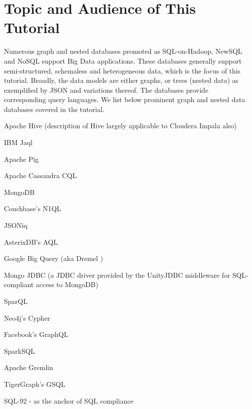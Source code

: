 
\section{Topic and Audience of This Tutorial}
Numerous graph and nested databases promoted as SQL-on-Hadoop, NewSQL and NoSQL support Big Data applications. These databases generally support semi-structured, schemaless and heterogeneous data, which is the focus of this tutorial. Broadly, the data models are either graphs, or trees (nested data) as exemplified by JSON and variations thereof. The databases provide corresponding query languages. We list below prominent graph and nested data databases covered in ths tutorial.


\begin{compact_enum}
\item Apache Hive \cite{hive-icde-2010} (description of Hive largely applicable to Cloudera Impala \cite{impala} also)
\item IBM Jaql \cite{jaql-pvldb-2011}
\item Apache Pig \cite{pig-sigmod-2008}
\item Apache Cassandra CQL \cite{cassandra-osr-2010}
\item MongoDB \cite{mongodb}
\item Couchbase's N1QL \cite{couchbase,couchbase-sigmod-2016}
\item JSONiq \cite{jsoniq-ieee-ic-2013}
\item AsterixDB's AQL \cite{asterixdb-dpd-2011-all-authors}
\item Google Big Query (aka Dremel \cite{dremel-pvldb-2010})
\item Mongo JDBC \cite{unityjdbc} (a JDBC driver provided by the UnityJDBC middleware for SQL-compliant access to MongoDB)
\item SparQL \cite{sparql}
\item Neo4j's Cypher \cite{cypher}
\item Facebook's GraphQL \cite{graphql}
\item SparkSQL \cite{sparksql}
\item Apache Gremlin \cite{gremlin}
\item TigerGraph's GSQL \cite{gsql}
\item SQL-92 - as the anchor of SQL compliance
\end{compact_enum}


